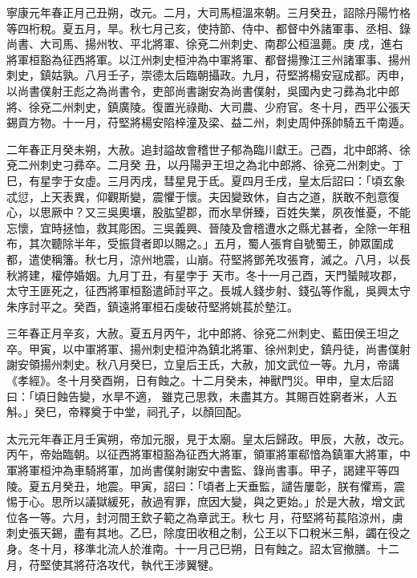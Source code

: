 \begin{pinyinscope}
 寧康元年春正月己丑朔，改元。二月，大司馬桓溫來朝。三月癸丑，詔除丹陽竹格等四桁稅。夏五月，旱。秋七月己亥，使持節、侍中、都督中外諸軍事、丞相、錄尚書、大司馬、揚州牧、平北將軍、徐兗二州刺史、南郡公桓溫薨。庚
 戌，進右將軍桓豁為征西將軍。以江州刺史桓沖為中軍將軍、都督揚豫江三州諸軍事、揚州刺史，鎮姑孰。八月壬子，崇德太后臨朝攝政。九月，苻堅將楊安寇成都。丙申，以尚書僕射王彪之為尚書令，吏部尚書謝安為尚書僕射，吳國內史刁彞為北中郎將、徐兗二州刺史，鎮廣陵。復置光祿勛、大司農、少府官。冬十月，西平公張天錫貢方物。十一月，苻堅將楊安陷梓潼及梁、益二州，刺史周仲孫帥騎五千南遁。



 二年春正月癸未朔，大赦。追封謚故會稽世子郁為臨川獻王。己酉，北中郎將、徐兗二州刺史刁彞卒。二月癸
 丑，以丹陽尹王坦之為北中郎將、徐兗二州刺史。丁巳，有星孛于女虛。三月丙戌，彗星見于氐。夏四月壬戌，皇太后詔曰：「頃玄象忒愆，上天表異，仰觀斯變，震懼于懷。夫因變致休，自古之道，朕敢不剋意復心，以思厥中？又三吳奧壤，股肱望郡，而水旱併臻，百姓失業，夙夜惟憂，不能忘懷，宜時拯恤，救其彫困。三吳義興、晉陵及會稽遭水之縣尤甚者，全除一年租布，其次聽除半年，受振貸者即以賜之。」五月，蜀人張育自號蜀王，帥眾圍成都，遣使稱籓。秋七月，涼州地震，山崩。苻堅將鄧羌攻張育，滅之。八月，以長秋將建，權停婚姻。九月丁丑，有星孛于
 天市。冬十一月己酉，天門蜑賊攻郡，太守王匪死之，征西將軍桓豁遣師討平之。長城人錢步射、錢弘等作亂，吳興太守朱序討平之。癸酉，鎮遠將軍桓石虔破苻堅將姚萇於墊江。



 三年春正月辛亥，大赦。夏五月丙午，北中郎將、徐兗二州刺史、藍田侯王坦之卒。甲寅，以中軍將軍、揚州刺史桓沖為鎮北將軍、徐州刺史，鎮丹徒，尚書僕射謝安領揚州刺史。秋八月癸巳，立皇后王氏，大赦，加文武位一等。九月，帝講《孝經》。冬十月癸酉朔，日有蝕之。十二月癸未，神獸門災。甲申，皇太后詔曰：「頃日蝕告變，水旱不適，
 雖克己思救，未盡其方。其賜百姓窮者米，人五斛。」癸巳，帝釋奠于中堂，祠孔子，以顏回配。



 太元元年春正月壬寅朔，帝加元服，見于太廟。皇太后歸政。甲辰，大赦，改元。丙午，帝始臨朝。以征西將軍桓豁為征西大將軍，領軍將軍郗愔為鎮軍大將軍，中軍將軍桓沖為車騎將軍，加尚書僕射謝安中書監、錄尚書事。甲子，謁建平等四陵。夏五月癸丑，地震。甲寅，詔曰：「頃者上天垂監，譴告屢彰，朕有懼焉，震惕于心。思所以議獄緩死，赦過宥罪，庶因大變，與之更始。」於是大赦，增文武位各一等。六月，封河間王欽子範之為章武王。秋七
 月，苻堅將茍萇陷涼州，虜刺史張天錫，盡有其地。乙巳，除度田收租之制，公王以下口稅米三斛，蠲在役之身。冬十月，移準北流人於淮南。十一月己巳朔，日有蝕之。詔太官撤膳。十二月，苻堅使其將苻洛攻代，執代王涉翼犍。




\end{pinyinscope}
